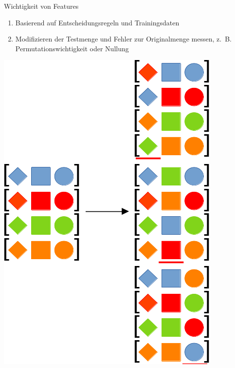 \documentclass[10pt]{beamer}
\begin{document}
\begin{frame}{Wichtigkeit von Features}
    \begin{minipage}{.5\textwidth}
        \begin{enumerate}
            \item Basierend auf Entscheidungsregeln und Trainingsdaten
            \item Modifizieren der Testmenge und Fehler zur Originalmenge messen, z.~B. Permutationswichtigkeit oder Nullung
        \end{enumerate}
    \end{minipage}%
    \begin{minipage}{.5\textwidth}
        \centering
        \includegraphics[width=0.9\linewidth]{model/permutatation_importance.png}
    \end{minipage}
\end{frame}
\end{document}
